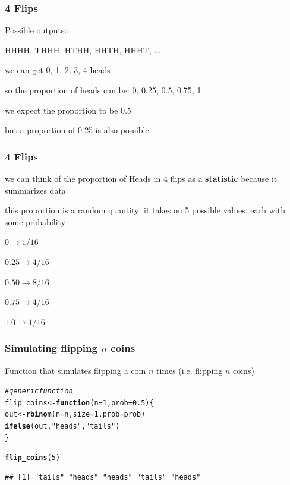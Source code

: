\documentclass[12pt]{beamer}\usepackage[]{graphicx}\usepackage[]{color}
\makeatletter
\newcommand{\hlnum}[1]{\textcolor[rgb]{0.686,0.059,0.569}{#1}}%
\newcommand{\hlstr}[1]{\textcolor[rgb]{0.192,0.494,0.8}{#1}}%
\newcommand{\hlcom}[1]{\textcolor[rgb]{0.678,0.584,0.686}{\textit{#1}}}%
\newcommand{\hlstd}[1]{\textcolor[rgb]{0.345,0.345,0.345}{#1}}%
\newcommand{\hlkwa}[1]{\textcolor[rgb]{0.161,0.373,0.58}{\textbf{#1}}}%
\newcommand{\hlkwb}[1]{\textcolor[rgb]{0.69,0.353,0.396}{#1}}%
\newcommand{\hlkwc}[1]{\textcolor[rgb]{0.333,0.667,0.333}{#1}}%
\newcommand{\hlkwd}[1]{\textcolor[rgb]{0.737,0.353,0.396}{\textbf{#1}}}%
\newenvironment{kframe}{%
 \def\at@end@of@kframe{}%
 \ifinner\ifhmode%
  \def\at@end@of@kframe{\end{minipage}}%
  \begin{minipage}{\columnwidth}%
 \fi\fi%
 \def\FrameCommand##1{\hskip\@totalleftmargin \hskip-\fboxsep
 \colorbox{shadecolor}{##1}\hskip-\fboxsep
     \hskip-\linewidth \hskip-\@totalleftmargin \hskip\columnwidth}%
 \MakeFramed {\advance\hsize-\width
   \@totalleftmargin\z@ \linewidth\hsize
   \@setminipage}}%
 {\par\unskip\endMakeFramed%
 \at@end@of@kframe}
\newenvironment{knitrout}{}{} %
\makeatother
\begin{document}
\begin{frame}[fragile]
\frametitle{4 Flips}

\bi
  \item Possible outputs:
  \bi
    \item HHHH, THHH, HTHH, HHTH, HHHT, ...
  \ei
  \item we can get 0, 1, 2, 3, 4 heads
  \item so the proportion of heads can be: 0, 0.25, 0.5, 0.75, 1
  \item we expect the proportion to be 0.5
  \item but a proportion of 0.25 is also possible
\ei
\eb

\end{frame}


\begin{frame}[fragile]
\frametitle{4 Flips}

\bbi
  \item we can think of the proportion of Heads in 4 flips as a \textbf{statistic} because it summarizes data 
  \item this proportion is a random quantity: it takes on 5 possible values, each with some probability
  \bi
    \item $0 \rightarrow 1/16$
    \item $0.25 \rightarrow 4/16$
    \item $0.50 \rightarrow 8/16$
    \item $0.75 \rightarrow 4/16$
    \item $1.0 \rightarrow 1/16$
  \ei
\ei

\end{frame}


\begin{frame}[fragile]
\frametitle{Simulating flipping $n$ coins}

Function that simulates flipping a coin $n$ times (i.e. flipping $n$ coins)
\begin{knitrout}\footnotesize
{}\color{fgcolor}\begin{kframe}
\begin{alltt}
\hlcom{# generic function}
\hlstd{flip_coins} \hlkwb{<-} \hlkwa{function}\hlstd{(}\hlkwc{n} \hlstd{=} \hlnum{1}\hlstd{,} \hlkwc{prob} \hlstd{=} \hlnum{0.5}\hlstd{) \{}
  \hlstd{out} \hlkwb{<-} \hlkwd{rbinom}\hlstd{(}\hlkwc{n} \hlstd{= n,} \hlkwc{size} \hlstd{=} \hlnum{1}\hlstd{,} \hlkwc{prob} \hlstd{= prob)}
  \hlkwd{ifelse}\hlstd{(out,} \hlstr{"heads"}\hlstd{,} \hlstr{"tails"}\hlstd{)}
\hlstd{\}}

\hlkwd{flip_coins}\hlstd{(}\hlnum{5}\hlstd{)}
\end{alltt}
\begin{verbatim}
## [1] "tails" "heads" "heads" "tails" "heads"
\end{verbatim}
\end{kframe}
\end{knitrout}

\end{frame}
\end{document}

